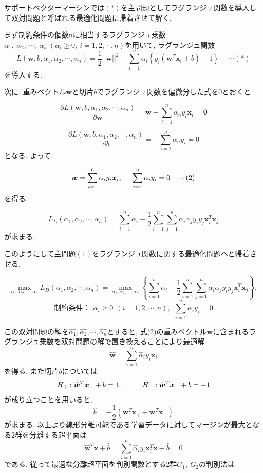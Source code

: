\documentclass{jarticle}
\begin{document}
サポートベクターマーシンでは$(*)$を主問題としてラグランジュ関数を導入して双対問題と呼ばれる最適化問題に帰着させて解く.

まず制約条件の個数nに相当するラグランジュ乗数$\alpha_1,\ \alpha_2,\ \cdots,\ \alpha_n\ (\alpha_i \geq 0;\ i=1,2,\cdots, n)$を用いて, ラグランジュ関数
\[L(\bm{w}, b, \alpha_1, \alpha_2, \cdots, \alpha_n) = \frac{1}{2}||\bm{w}||^2 - \sum_{i=1}^n \alpha_i \left\{y_i (\bm{w}^T \bm{x}_i + b) - 1\right\} \ \ \ \ \ \ \cdots (*)\]を導入する.

次に, 重みベクトル$\bm{w}$と切片$b$でラグランジュ関数を偏微分した式を0とおくと

\[\frac{\partial L(\bm{w}, b, \alpha_1, \alpha_2, \cdots, \alpha_n)}{\partial \bm{w}} = \bm{w} - \sum_{i=1}^n \alpha_n y_i \bm{x}_i = \bm{0}\]

\[\frac{\partial L(\bm{w}, b, \alpha_1, \alpha_2, \cdots, \alpha_n)}{\partial b} = - \sum_{i=1}^n \alpha_n y_i = 0\]
となる. よって

\[\bm{w} = \sum_{i=1}^n \alpha_i y_i \bm{x}_i,\hspace{5mm} \sum_{i=1}^n \alpha_i y_i = 0\ \ \cdots(2)\]
 を得る.
 
\[L_D (\alpha_1, \alpha_2, \cdots, \alpha_n) =  \sum_{i=1}^n \alpha_i  - \frac{1}{2} \sum_{i=1}^n  \sum_{j=1}^n \alpha_i \alpha_j y_i y_j \bm{x}_i^T\bm{x}_j\]
 が求まる.
 
このようにして主問題$(1)$をラグランジュ関数に関する最適化問題へと帰着させる.
 
 \[\max_{\alpha_1, \alpha_2, \cdots, \alpha_n} L_D (\alpha_1, \alpha_2, \cdots, \alpha_n)  = \max_{\alpha_1, \alpha_2, \cdots, \alpha_n} \left\{ \sum_{i=1}^n \alpha_i  - \frac{1}{2} \sum_{i=1}^n  \sum_{j=1}^n \alpha_i \alpha_j y_i y_j \bm{x}_i^T\bm{x}_j \right\},\]
 \[\mbox{制約条件：}\ \ \alpha_i \geq 0 \ \ (i=1,2,\cdots,n),\ \ \sum_{i=1}^n \alpha_i y_i = 0\]
 
この双対問題の解を$\hat{\alpha_1}, \hat{\alpha_2}, \cdots, \hat{\alpha_n}$とすると, 式(2)の重みベクトル$\bm{w}$に含まれるラグランジュ乗数を双対問題の解で置き換えることにより最適解
\[\hat{\bm{w}} = \sum_{i=1}^n \hat{\alpha}_i y_i \bm{x}_i\]
を得る. また切片$b$については
\[H_+ : \hat{\bm{w}}^T \bm{x}_+ + b = 1,\hspace{10mm} H_- : \hat{\bm{w}}^T\bm{x}_- + b = -1\]
 が成り立つことを用いると, 
 \[\hat{b} = -\frac{1}{2}(\bm{w}^T \bm{x}_+ + \bm{w}^T \bm{x}_-)\]
 が求まる.
 以上より線形分離可能である学習データに対してマージンが最大となる2群を分離する超平面は
 \[\hat{\bm{w}}^T \bm{x} + \hat{b} = \sum_{i=1}^n \hat{\alpha}_i y_i \bm{x}_i^T \bm{x} + \hat{b} = 0\]
である. 従って最適な分離超平面を判別関数とする2群$G_1,\ G_2$の判別法は
 
\end{document}
